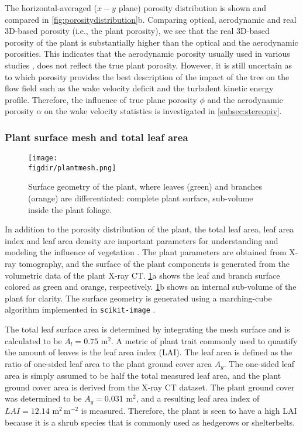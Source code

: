 The horizontal-averaged ($x-y$ plane) porosity distribution is shown and compared in \cref{fig:porositydistribution}b. Comparing optical, aerodynamic and real 3D-based porosity (i.e., the plant porosity), we see that the real 3D-based porosity of the plant is substantially higher than the optical and the aerodynamic porosities. This indicates that the aerodynamic porosity usually used in various studies \citep{Bitog2011b,Guan2003,Manickathan2018b}, does not reflect the true plant porosity. However, it is still uncertain as to which porosity provides the best description of the impact of the tree on the flow field such as the wake velocity deficit and the turbulent kinetic energy profile. Therefore, the influence of true plane porosity $\phi$ and the aerodynamic porosity $\alpha$ on the wake velocity statistics is investigated in \cref{subsec:stereopiv}.

\subsubsection*{Plant surface mesh and total leaf area}

\begin{figure}[t]
	\centering
	\texttt{[image: \\figdir/plantmesh.png]}
	\caption{Surface geometry of the plant, where leaves (green) and branches (orange) are differentiated:  complete plant surface,  sub-volume inside the plant foliage.}
	\label{fig:plantmesh}
\end{figure}

In addition to the porosity distribution of the plant, the total leaf area, leaf area index and leaf area density are important parameters for understanding and modeling the influence of vegetation \citep{Manickathan2018a}. The plant parameters are obtained from X-ray tomography, and the surface of the plant components is generated from the volumetric data of the plant X-ray CT. \cref{fig:plantmesh}a shows the leaf and branch surface colored as green and orange, respectively. \cref{fig:plantmesh}b shows an internal sub-volume of the plant for clarity. The surface geometry is generated using a marching-cube algorithm implemented in \texttt{scikit-image} \citep{VanderWalt2014a}.

The total leaf surface area is determined by integrating the mesh surface and is calculated to be $A_l=0.75$ m$^2$. A metric of plant trait commonly used to quantify the amount of leaves is the leaf area index (LAI). The leaf area is defined as the ratio of one-sided leaf area to the plant ground cover area $A_g$. The one-sided leaf area is simply assumed to be half the total measured leaf area, and the plant ground cover area is derived from the X-ray CT dataset. The plant ground cover was determined to be $A_g=0.031$ m$^2$, and a resulting leaf area index of $\textit{LAI}=12.14$ m$^2$\,m$^{-2}$ is measured. Therefore, the plant is seen to have a high LAI because it is a shrub species that is commonly used as hedgerows or shelterbelts.

